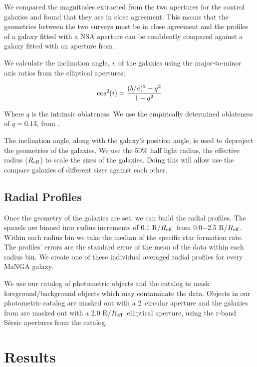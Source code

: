 \documentclass[iop,revtex4,twocolumn,apj,numberedappendix,appendixfloats]{emulateapj}
\newcommand{\reff}{$R_{\rm eff}$}
\begin{document}
We compared the magnitudes extracted from the two apertures for the control galaxies and found that they are in close agreement. This means that the geometries between the two surveys must be in close agreement and the profiles of a galaxy fitted with a NSA aperture can be confidently compared against a galaxy fitted with an aperture from \citet{Simard:2011}. 

We calculate the inclination angle, {\it i}, of the galaxies using the major-to-minor axis ratios from the elliptical apertures;

\begin{equation}
{\rm cos^2}(i) = \frac{(b/a)^2 - q^2}{1 - q^2}
\end{equation}

Where $q$ is the intrinsic oblateness. We use the empirically determined oblateness of $q = 0.13$, from \citet{Giovanelli:1994}.

The inclination angle, along with the galaxy's position angle, is used to deproject the geometries of the galaxies. We use the 50\% half light radius, the effective radius (\reff) to scale the sizes of the galaxies. Doing this will allow use the compare galaxies of different sizes against each other.

\subsection{Radial Profiles}

Once the geometry of the galaxies are set, we can build the radial profiles. The spaxels are binned into radius increments of 0.1 R/\reff\ from 0.0$-$2.5 R/\reff. Within each radius bin we take the median of the specific star formation rate. The profiles' errors are the standard error of the mean of the data within each radius bin. We create one of these individual averaged radial profiles for every MaNGA galaxy. 

We use our catalog of photometric objects and the \citet{Simard:2011} catalog to mask foreground/background objects which may contaminate the data. Objects in our photometric catalog are masked out with a 2\arcsec\ circular aperture and the galaxies from \citet{Simard:2011} are masked out with a 2.0 R/\reff\ elliptical aperture, using the r-band S\'ersic apertures from the catalog. 


\section{Results}\label{sec:results}
\end{document}
